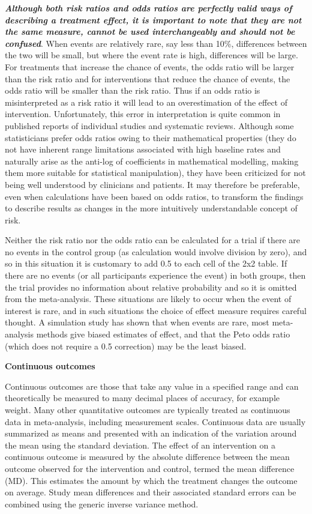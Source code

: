 \documentclass[
  10pt,
  a4paper,
  DIV=11,
  numbers=noendperiod]{scrreprt}
\begin{document}
\textbf{\emph{Although both risk ratios and odds ratios are perfectly
valid ways of describing a treatment effect, it is important to note
that they are not the same measure, cannot be used interchangeably and
should not be confused}}. When events are relatively rare, say less than
10\%, differences between the two will be small, but where the event
rate is high, differences will be large. For treatments that increase
the chance of events, the odds ratio will be larger than the risk ratio
and for interventions that reduce the chance of events, the odds ratio
will be smaller than the risk ratio. Thus if an odds ratio is
misinterpreted as a risk ratio it will lead to an overestimation of the
effect of intervention. Unfortunately, this error in interpretation is
quite common in published reports of individual studies and systematic
reviews. Although some statisticians prefer odds ratios owing to their
mathematical properties (they do not have inherent range limitations
associated with high baseline rates and naturally arise as the anti-log
of coefficients in mathematical modelling, making them more suitable for
statistical manipulation), they have been criticized for not being well
understood by clinicians and patients. It may therefore be preferable,
even when calculations have been based on odds ratios, to transform the
findings to describe results as changes in the more intuitively
understandable concept of risk.

Neither the risk ratio nor the odds ratio can be calculated for a trial
if there are no events in the control group (as calculation would
involve division by zero), and so in this situation it is customary to
add 0.5 to each cell of the 2x2 table. If there are no events (or all
participants experience the event) in both groups, then the trial
provides no information about relative probability and so it is omitted
from the meta-analysis. These situations are likely to occur when the
event of interest is rare, and in such situations the choice of effect
measure requires careful thought. A simulation study has shown that when
events are rare, most meta-analysis methods give biased estimates of
effect, and that the Peto odds ratio (which does not require a 0.5
correction) may be the least biased.

\textbf{Continuous outcomes}

Continuous outcomes are those that take any value in a specified range
and can theoretically be measured to many decimal places of accuracy,
for example weight. Many other quantitative outcomes are typically
treated as continuous data in meta-analysis, including measurement
scales. Continuous data are usually summarized as means and presented
with an indication of the variation around the mean using the standard
deviation. The effect of an intervention on a continuous outcome is
measured by the absolute difference between the mean outcome observed
for the intervention and control, termed the mean difference (MD). This
estimates the amount by which the treatment changes the outcome on
average. Study mean differences and their associated standard errors can
be combined using the generic inverse variance method.
\end{document}
